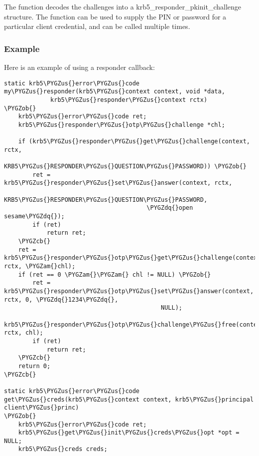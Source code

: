 \documentclass[letterpaper,10pt,english]{sphinxmanual}
\def\PYGZus{\char`\_}
\def\PYGZob{\char`\{}
\def\PYGZcb{\char`\}}
\def\PYGZam{\char`\&}
\def\PYGZdq{\char`\"}
\begin{document}
The {\hyperref[appdev/refs/api/krb5_responder_pkinit_get_challenge:c.krb5_responder_pkinit_get_challenge]{}} function decodes the
challenges into a krb5\_responder\_pkinit\_challenge structure.  The
{\hyperref[appdev/refs/api/krb5_responder_pkinit_set_answer:c.krb5_responder_pkinit_set_answer]{}} function can be used to
supply the PIN or password for a particular client credential, and can
be called multiple times.


\subsubsection{Example}
\label{appdev/init_creds:example}
Here is an example of using a responder callback:

\begin{Verbatim}[commandchars=\\\{\}]
static krb5\PYGZus{}error\PYGZus{}code
my\PYGZus{}responder(krb5\PYGZus{}context context, void *data,
             krb5\PYGZus{}responder\PYGZus{}context rctx)
\PYGZob{}
    krb5\PYGZus{}error\PYGZus{}code ret;
    krb5\PYGZus{}responder\PYGZus{}otp\PYGZus{}challenge *chl;

    if (krb5\PYGZus{}responder\PYGZus{}get\PYGZus{}challenge(context, rctx,
                                     KRB5\PYGZus{}RESPONDER\PYGZus{}QUESTION\PYGZus{}PASSWORD)) \PYGZob{}
        ret = krb5\PYGZus{}responder\PYGZus{}set\PYGZus{}answer(context, rctx,
                                        KRB5\PYGZus{}RESPONDER\PYGZus{}QUESTION\PYGZus{}PASSWORD,
                                        \PYGZdq{}open sesame\PYGZdq{});
        if (ret)
            return ret;
    \PYGZcb{}
    ret = krb5\PYGZus{}responder\PYGZus{}otp\PYGZus{}get\PYGZus{}challenge(context, rctx, \PYGZam{}chl);
    if (ret == 0 \PYGZam{}\PYGZam{} chl != NULL) \PYGZob{}
        ret = krb5\PYGZus{}responder\PYGZus{}otp\PYGZus{}set\PYGZus{}answer(context, rctx, 0, \PYGZdq{}1234\PYGZdq{},
                                            NULL);
        krb5\PYGZus{}responder\PYGZus{}otp\PYGZus{}challenge\PYGZus{}free(context, rctx, chl);
        if (ret)
            return ret;
    \PYGZcb{}
    return 0;
\PYGZcb{}

static krb5\PYGZus{}error\PYGZus{}code
get\PYGZus{}creds(krb5\PYGZus{}context context, krb5\PYGZus{}principal client\PYGZus{}princ)
\PYGZob{}
    krb5\PYGZus{}error\PYGZus{}code ret;
    krb5\PYGZus{}get\PYGZus{}init\PYGZus{}creds\PYGZus{}opt *opt = NULL;
    krb5\PYGZus{}creds creds;


\end{Verbatim}
\end{document}
